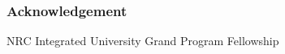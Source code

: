 \begin{frame}
  \frametitle{Acknowledgement}
        NRC Integrated University Grand Program Fellowship
\end{frame}
